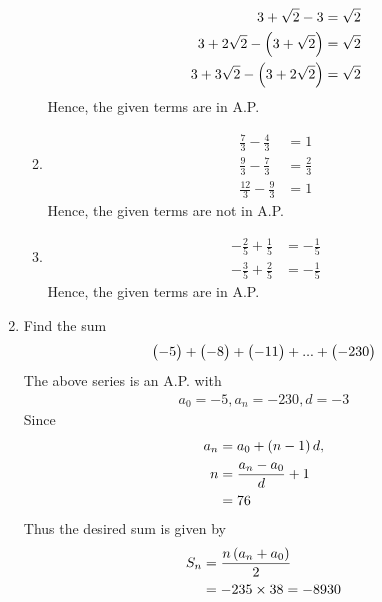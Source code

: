 \documentclass[journal,12pt,twocolumn]{IEEEtran}
\begin{document}
\begin{enumerate}
\begin{enumerate}
				\begin{align}
					3 + \sqrt{2} - 3 = \sqrt{2} \\
					3 + 2\sqrt{2} - \left(3+ \sqrt{2}\right)= \sqrt{2} \\
					3 + 3\sqrt{2} - \left(3+ 2\sqrt{2}\right)= \sqrt{2} 
				\end{align}
				Hence, the given terms are in A.P.
    \item 
	    \begin{align}
		    \frac{7}{3} -   \frac{4}{3} &= 1
		    \\
		     \frac{9}{3}-\frac{7}{3} &= \frac{2}{3}
		     \\
		    \frac{12}{3}-\frac{9}{3} &= 1
	    \end{align}
				Hence, the given terms are not in A.P.
			\item
				\begin{align}
					-\frac{2}{5} +   \frac{1}{5} &= -\frac{1}{5}
		    \\
					-\frac{3}{5} +   \frac{2}{5} &= -\frac{1}{5}
	    \end{align}
				Hence, the given terms are in A.P.
  
\end{enumerate}
    \item Find the sum
	    \begin{align}
    \begin{pmatrix}-5\end{pmatrix} + \begin{pmatrix}-8\end{pmatrix} + \begin{pmatrix}-11\end{pmatrix} + ... + \begin{pmatrix}-230\end{pmatrix}
	    \end{align}
	    \solution The above series is an A.P. with 
	    \begin{align}
		    a_0 = -5, a_n = -230, d = -3
	    \end{align}
	    Since 
	    \begin{align}
		    a_n &= a_0 + \left(n-1\right)d, 
		    \\
		    n &= \frac{a_n - a_0}{d} + 1
		    \\
		     &= 76
	    \end{align}
	    Thus the desired sum is given by 
	    \begin{align}
		    S_n &=  \frac{n\left(a_n + a_0\right)}{2}  
		    \\
		    &=  -235 \times 38 = -8930
	    \end{align}

    
    
\end{enumerate}
\end{document}
